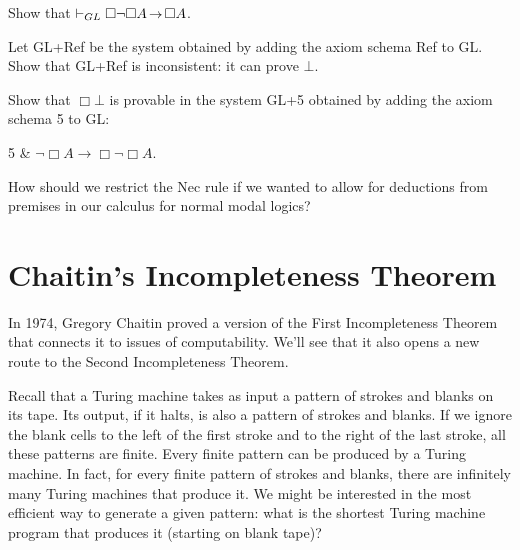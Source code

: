 \begin{exercise}
  Show that $\proves_{GL} \Box\neg\Box A \to \Box A$.
\end{exercise}

\begin{exercise}
  Let GL+Ref be the system obtained by adding the axiom schema Ref to GL.
  Show that GL+Ref is inconsistent:
  it can prove $\bot$.
\end{exercise}

\begin{exercise}
  Show that $\Box \bot$ is provable in the system GL+5
  obtained by adding the axiom schema 5 to GL:
  \vspace{-0.2em}
    \begin{axioms}
      5 & $\neg \Box A \to \Box \neg \Box A$.
    \end{axioms}
  \vspace{-1em}
\end{exercise}


\begin{exercise}
  How should we restrict the Nec rule
  if we wanted to allow for deductions from premises in our calculus for normal modal logics?
\end{exercise}


\section{Chaitin's Incompleteness Theorem}

In 1974,
Gregory Chaitin proved a version of the First Incompleteness Theorem that
connects it to issues of computability.
We'll see that it also opens a new route to the Second Incompleteness Theorem.

Recall that a Turing machine takes as input a pattern of strokes and blanks on its tape.
Its output,
if it halts,
is also a pattern of strokes and blanks.
If we ignore the blank cells to the left of the first stroke
and to the right of the last stroke,
all these patterns are finite.
Every finite pattern can be produced by a Turing machine.
In fact,
for every finite pattern of strokes and blanks,
there are infinitely many Turing machines that produce it.
We might be interested in the most efficient way to generate a given pattern:
what is the shortest Turing machine program that produces it
(starting on blank tape)?

